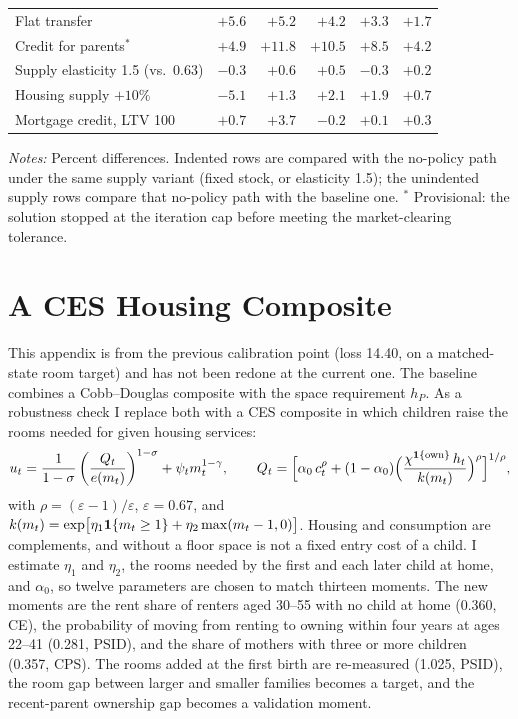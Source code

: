 \begin{table}[p]
\begin{tabularx}{\textwidth}{@{}Xrrrrr@{}}
\quad Flat transfer & $+5.6$ & $+5.2$ & $+4.2$ & $+3.3$ & $+1.7$ \\
\quad Credit for parents$^{*}$ & $+4.9$ & $+11.8$ & $+10.5$ & $+8.5$ & $+4.2$ \\
Supply elasticity 1.5 (vs.\ 0.63) & $-0.3$ & $+0.6$ & $+0.5$ & $-0.3$ & $+0.2$ \\
\quad Housing supply $+10\%$ & $-5.1$ & $+1.3$ & $+2.1$ & $+1.9$ & $+0.7$ \\
\quad Mortgage credit, LTV 100 & $+0.7$ & $+3.7$ & $-0.2$ & $+0.1$ & $+0.3$ \\
\bottomrule
\end{tabularx}
\par\smallskip
\begin{minipage}{0.95\linewidth}
\footnotesize\textit{Notes:} Percent differences. Indented rows are compared
with the no-policy path under the same supply variant (fixed stock, or
elasticity 1.5); the unindented supply rows compare that no-policy path with
the baseline one. $^{*}$ Provisional: the solution stopped at the iteration
cap before meeting the market-clearing tolerance.
\end{minipage}
\end{table}

\section{A CES Housing Composite}
\label{app:ces}

This appendix is from the previous calibration point (loss 14.40, on a
matched-state room target) and has not been redone at the current one. The
baseline combines a Cobb--Douglas composite with the space requirement
$h_P$. As a robustness check I replace both with a CES composite in which
children raise the rooms needed for given housing services:
\begin{equation}
 u_t=\frac{1}{1-\sigma}\left(\frac{Q_t}{e(m_t)}\right)^{1-\sigma}+\psi_t m_t^{1-\gamma},\qquad
 Q_t=\Bigl[\alpha_0\,c_t^{\rho}+(1-\alpha_0)\Bigl(\frac{\chi^{\mathbf 1\{\mathrm{own}\}}\,h_t}{k(m_t)}\Bigr)^{\rho}\Bigr]^{1/\rho},
\end{equation}
with $\rho=(\varepsilon-1)/\varepsilon$, $\varepsilon=0.67$, and
$k(m_t)=\exp\bigl[\eta_1\mathbf 1\{m_t\ge1\}+\eta_2\max(m_t-1,0)\bigr]$. Housing and
consumption are complements, and without a floor space is not a fixed entry
cost of a child. I estimate $\eta_1$ and $\eta_2$, the rooms needed by the
first and each later child at home, and $\alpha_0$, so twelve parameters are
chosen to match thirteen moments. The new moments are the rent share of
renters aged 30--55 with no child at home (0.360, CE), the probability of
moving from renting to owning within four years at ages 22--41 (0.281, PSID),
and the share of mothers with three or more children (0.357, CPS). The rooms
added at the first birth are re-measured (1.025, PSID), the room gap between
larger and smaller families becomes a target, and the recent-parent
ownership gap becomes a validation moment.

